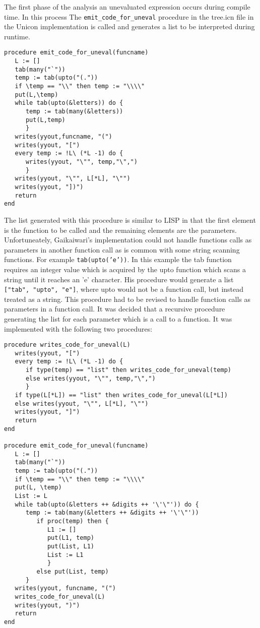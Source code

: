 \documentclass{article}
\begin{document}
The first phase of the analysis an unevaluated expression occurs during compile time.  In this process The \texttt{emit\_code\_for\_uneval} procedure in the tree.icn file in the Unicon implementation is called and generates a list to be interpreted during runtime.
\begin{verbatim}
procedure emit_code_for_uneval(funcname)
   L := []
   tab(many("`"))
   temp := tab(upto("(.")) 
   if \temp == "\\" then temp := "\\\\"
   put(L,\temp)
   while tab(upto(&letters)) do {
      temp := tab(many(&letters))
      put(L,temp)
      }
   writes(yyout,funcname, "(")
   writes(yyout, "[")
   every temp := !L\ (*L -1) do {
      writes(yyout, "\"", temp,"\",")
      }
   writes(yyout, "\"", L[*L], "\"")
   writes(yyout, "])")
   return
end
\end{verbatim}
The list generated with this procedure is similar to LISP in that the first element is the function to be called and the remaining elements are the parameters.  Unfortuneately, Gaikaiwari's implementation could not handle functions calls as parameters in another function call as is common with some string scanning functions.  For example \texttt{tab(upto('e'))}.  In this example the tab function requires an integer value which is acquired by the upto function which scans a string until it reaches an 'e' character.  His procedure would generate a list \texttt{["tab", "upto", "e"]}, where upto would not be a function call, but instead treated as a string.  This procedure had to be revised to handle function calls as parameters in a function call.  It was decided that a recursive procedure generating the list for each parameter which is a call to a function.  It was implemented with the following two procedures: 
\begin{verbatim}
procedure writes_code_for_uneval(L)
   writes(yyout, "[")
   every temp := !L\ (*L -1) do {
      if type(temp) == "list" then writes_code_for_uneval(temp)
	  else writes(yyout, "\"", temp,"\",")
      }
   if type(L[*L]) == "list" then writes_code_for_uneval(L[*L])
   else writes(yyout, "\"", L[*L], "\"")
   writes(yyout, "]")
   return
end

procedure emit_code_for_uneval(funcname)
   L := []
   tab(many("`"))
   temp := tab(upto("(.")) 
   if \temp == "\\" then temp := "\\\\"
   put(L, \temp)
   List := L
   while tab(upto(&letters ++ &digits ++ '\'\"')) do {
      temp := tab(many(&letters ++ &digits ++ '\'\"'))
         if proc(temp) then {
            L1 := []
            put(L1, temp)
            put(List, L1)
            List := L1
            } 
         else put(List, temp)
      }
   writes(yyout, funcname, "(")
   writes_code_for_uneval(L)
   writes(yyout, ")")
   return
end
\end{verbatim}
\end{document}
